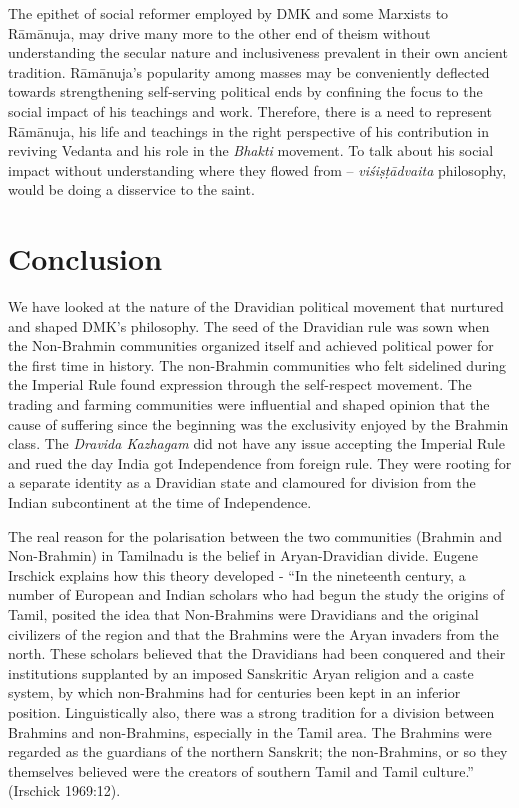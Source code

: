 \vskip 4pt

The epithet of social reformer employed by DMK and some Marxists to Rāmānuja, may drive many more to the other end of theism without understanding the secular nature and inclusiveness prevalent in their own ancient tradition. Rāmānuja’s popularity among masses may be conveniently deflected towards strengthening self-serving political ends by confining the focus to the social impact of his teachings and work. Therefore, there is a need to represent Rāmānuja, his life and teachings in the right perspective of his contribution in reviving Vedanta and his role in the \textit{Bhakti} movement. To talk about his social impact without understanding where they flowed from – \textit{viśiṣṭādvaita} philosophy, would be doing a disservice to the saint.


\section*{Conclusion}

We have looked at the nature of the Dravidian political movement that nurtured and shaped DMK’s philosophy. The seed of the Dravidian rule was sown when the Non-Brahmin communities organized itself and achieved political power for the first time in history. The non-Brahmin communities who felt sidelined during the Imperial Rule found expression through the self-respect movement. The trading and farming communities were influential and shaped opinion that the cause of suffering since the beginning was the exclusivity enjoyed by the Brahmin class. The \textit{Dravida Kazhagam} did not have any issue accepting the Imperial Rule and rued the day India got Independence from foreign rule. They were rooting for a separate identity as a Dravidian state and clamoured for division from the Indian subcontinent at the time of Independence.

The real reason for the polarisation between the two communities (Brahmin and Non-Brahmin) in Tamilnadu is the belief in Aryan-Dravidian divide. Eugene Irschick explains how this theory developed - “In the nineteenth century, a number of European and Indian scholars who had begun the study the origins of Tamil, posited the idea that Non-Brahmins were Dravidians and the original civilizers of the region and that the Brahmins were the Aryan invaders from the north. These scholars believed that the Dravidians had been conquered and their institutions supplanted by an imposed Sanskritic Aryan religion and a caste system, by which non-Brahmins had for centuries been kept in an inferior position. Linguistically also, there was a strong tradition for a division between Brahmins and non-Brahmins, especially in the Tamil area. The Brahmins were regarded as the guardians of the northern Sanskrit; the non-Brahmins, or so they themselves believed were the creators of southern Tamil and Tamil culture.” (Irschick 1969:12).

